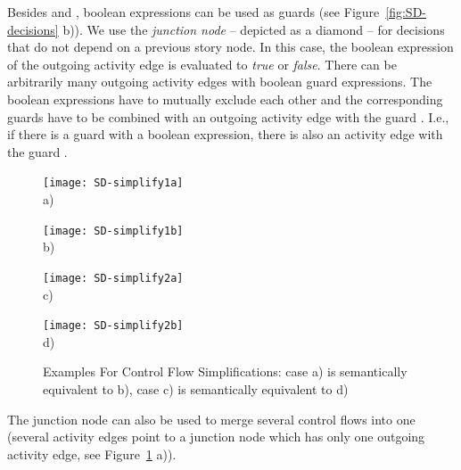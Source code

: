 Besides  and , boolean expressions can be used as guards (see Figure~\ref{fig:SD-decisions} b)).
We use the \emph{junction node} -- depicted as a diamond -- for decisions that do not depend on a previous story node.
In this case, the boolean expression of the outgoing activity edge is evaluated to \emph{true} or \emph{false}.
There can be arbitrarily many outgoing activity edges with boolean guard expressions.
The boolean expressions have to mutually exclude each other
and the corresponding guards have to be combined with an outgoing activity edge with the guard .
I.e., if there is a guard with a boolean expression, there is also an activity edge with the guard .

\begin{figure}[htb]
	\centering
  \begin{minipage}[t]{.24\textwidth}
    \centering
    \texttt{[image: SD-simplify1a]} 
    \\a)
  \end{minipage}%
  \hfill
  \begin{minipage}[t]{.24\textwidth}
    \centering
    \texttt{[image: SD-simplify1b]}
    \\b)
  \end{minipage}
  \hfill
  \begin{minipage}[t]{.24\textwidth}
    \centering
    \texttt{[image: SD-simplify2a]}
    \\c)
  \end{minipage}
  \hfill
  \begin{minipage}[t]{.24\textwidth}
    \centering
    \texttt{[image: SD-simplify2b]}
    \\d)
  \end{minipage}
  \caption[Examples For Control Flow Simplifications]{Examples For Control Flow Simplifications: case a) is semantically equivalent to b), case c) is semantically equivalent to d)}
  \label{fig:SD-simplifications}
\end{figure}

The junction node can also be used to merge several control flows into one
(several activity edges point to a junction node which has only one outgoing activity edge,
see Figure~\ref{fig:SD-simplifications} a)).


